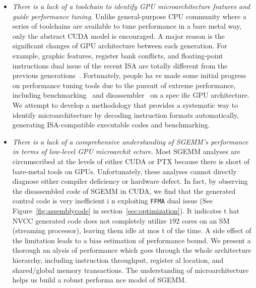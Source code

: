 \begin{itemize}
\item {\em There is a lack of a toolchain to identify GPU microarchitecture features and guide performance tuning.}
    Unlike general-purpose CPU community where a series of toolchains are available to tune performance in a bare metal
        way, only the abstract CUDA model is encouraged. A major reason is the significant changes of GPU architecture
        between each generation. For example, graphic features, register bank conflicts, and floating-point instructions
 dual
        issue of the recent ISA are totally different from the previous generations~\cite{fermi}. Fortunately, people ha
ve made
        some initial progress on performance tuning tools due to the pursuit of extreme performance, including
        benchmarking~\cite{mei, volkov, wong} and disassembler~\cite{asfermi,bernstein2012usable,decuda,maxas} on a spec
ific GPU architecture. We attempt to develop a methodology that provides a systematic way to identify microarchitecture 
by decoding instruction formats automatically, generating ISA-compatible executable codes and benchmarking.
\item {\em There is a lack of a comprehensive understanding of SGEMM's performance in terms of low-level GPU microarchit
ecture.} Most SGEMM analyses are circumscribed at the levels of either CUDA or PTX because there is short of bare-metal 
tools on GPUs. Unfortunately, these analyses cannot directly diagnose either compiler deficiency or hardware defect. In 
fact, by observing the disassembled code of SGEMM in CUDA, we find that the generated control code is very inefficient i
n exploiting {\tt FFMA} dual issue (See Figure~\ref{fig:assemblycode} in section~\ref{sec:optimization}). It indicates t
hat NVCC generated code does not completely utilize $192$ cores on an SM (streaming processor), leaving them idle at mos
t of the time. A side effect of the limitation leads to a bias estimation of performance bound. We present a thorough an
alysis of performance which goes through the whole architecture hierarchy, including instruction throughput, register al
location, and shared/global memory transactions. The understanding of microarchitecture helps us build a robust performa
nce model of SGEMM.
\end{itemize}

